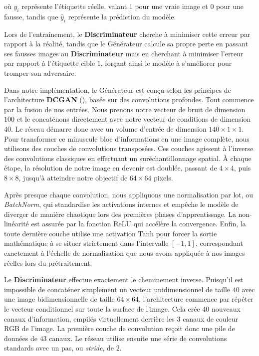 \documentclass{article}
\begin{document}
où $y_i$ représente l'étiquette réelle, valant $1$ pour une vraie image et $0$ pour une fausse, tandis que $\hat{y}_i$ représente la prédiction du modèle. 

Lors de l'entraînement, le \textbf{Discriminateur} cherche à minimiser cette erreur par rapport à la réalité, tandis que le Générateur calcule sa propre perte en passant ses fausses images au \textbf{Discriminateur} mais en cherchant à minimiser l'erreur par rapport à l'étiquette cible $1$, forçant ainsi le modèle à s'améliorer pour tromper son adversaire.

\medskip

Dans notre implémentation, le Générateur est conçu selon les principes de l'architecture \textbf{DCGAN} (\cite{dcgan15}), basée sur des convolutions profondes. Tout commence par la fusion de nos entrées. Nous prenons notre vecteur de bruit de dimension $100$ et le concaténons directement avec notre vecteur de conditions de dimension $40$. Le réseau démarre donc avec un volume d'entrée de dimension $140 \times 1 \times 1$. Pour transformer ce minuscule bloc d'informations en une image complète, nous utilisons des couches de convolutions transposées. Ces couches agissent à l'inverse des convolutions classiques en effectuant un suréchantillonnage spatial. À chaque étape, la résolution de notre image en devenir est doublée, passant de $4 \times 4$, puis $8 \times 8$, jusqu'à atteindre notre objectif de $64 \times 64$ pixels. 

Après presque chaque convolution, nous appliquons une normalisation par lot, ou \textit{BatchNorm}, qui standardise les activations internes et empêche le modèle de diverger de manière chaotique lors des premières phases d'apprentissage. La non-linéarité est assurée par la fonction ReLU qui accélère la convergence. Enfin, la toute dernière couche utilise une activation Tanh pour forcer la sortie mathématique à se situer strictement dans l'intervalle $[-1, 1]$, correspondant exactement à l'échelle de normalisation que nous avons appliquée à nos images réelles lors du prétraitement.

Le \textbf{Discriminateur} effectue exactement le cheminement inverse. Puisqu'il est impossible de concaténer simplement un vecteur unidimensionnel de taille $40$ avec une image bidimensionnelle de taille $64 \times 64$, l'architecture commence par répéter le vecteur conditionnel sur toute la surface de l'image. Cela crée $40$ nouveaux canaux d'information, empilés virtuellement derrière les $3$ canaux de couleur RGB de l'image. La première couche de convolution reçoit donc une pile de données de $43$ canaux. Le réseau utilise ensuite une série de convolutions standards avec un pas, ou \textit{stride}, de $2$. 
\end{document}
